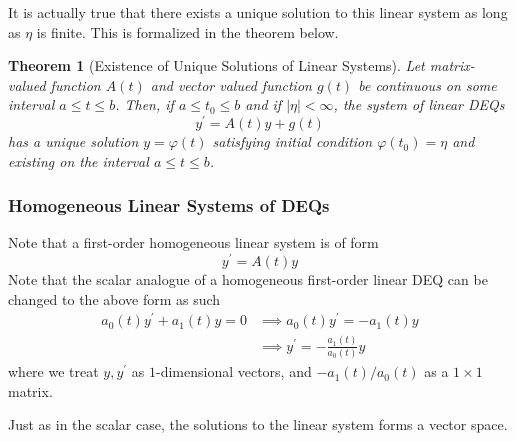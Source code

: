 \documentclass{article}
\newtheorem{theorem}{Theorem}[section]
\theoremstyle{remark}
\theoremstyle{definition}
\begin{document}
It is actually true that there exists a unique solution to this linear system as long as $\eta$ is finite. This is formalized in the theorem below. 

\begin{theorem}[Existence of Unique Solutions of Linear Systems]
Let matrix-valued function $A(t)$ and vector valued function $g(t)$ be continuous on some interval $a \leq t \leq b$. Then, if $a\leq t_0 \leq b$ and if $|\eta| < \infty$, the system of linear DEQs
\[y^\prime = A(t) y + g(t)\]
has a unique solution $y = \varphi(t)$ satisfying initial condition $\varphi(t_0) = \eta$ and existing on the interval $a \leq t \leq b$. 
\end{theorem}

\subsubsection{Homogeneous Linear Systems of DEQs}

Note that a first-order homogeneous linear system is of form 
\[y^\prime = A(t) y\]
Note that the scalar analogue of a homogeneous first-order linear DEQ can be changed to the above form as such 
\begin{align*}
    a_0 (t) y^\prime + a_1 (t) y = 0 & \implies a_0 (t) y^\prime = - a_1 (t) y \\
    & \implies y^\prime = -\frac{a_1 (t)}{a_0 (t)} y
\end{align*}
where we treat $y, y^\prime$ as $1$-dimensional vectors, and $-a_1(t)/a_0 (t)$ as a $1 \times 1$ matrix. 

Just as in the scalar case, the solutions to the linear system forms a vector space. 
\end{document}
